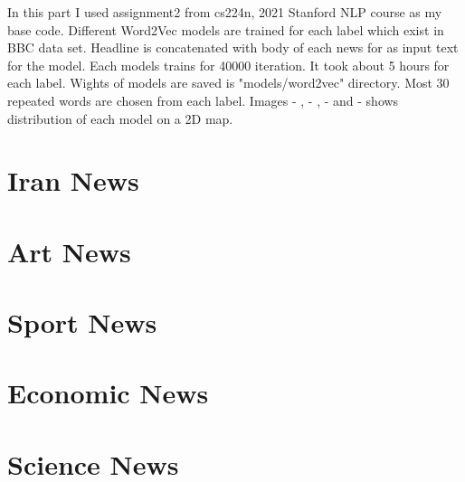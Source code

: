 \label{chapter:word2vec}


In this part I used assignment2 from cs224n, 2021 Stanford NLP course as my base code. Different Word2Vec models are trained for each label which exist in BBC data set. Headline is concatenated with body of each news for as input text for the model. Each models trains for 40000 iteration. It took about 5 hours for each label. Wights of models are saved is "models/word2vec" directory. Most 30 repeated words are chosen from each label. Images - , - , - and - shows distribution of each model on a 2D map. 

\section{Iran News}

\section{Art News}

\section{Sport News}

\section{Economic News}

\section{Science News}
